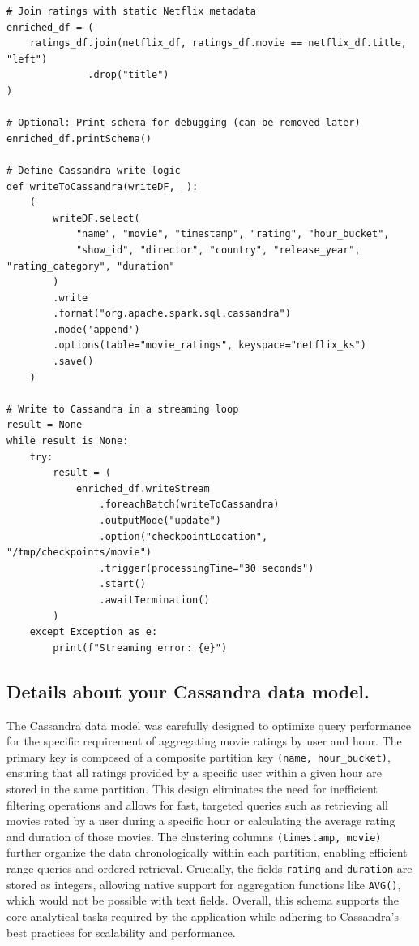 \documentclass[a4paper,11pt]{article}
\theoremstyle{mytheor}
\begin{document}
\begin{lstlisting}[label={list:second},caption=cassandra-spark-streaming-example.py.]
# Join ratings with static Netflix metadata
enriched_df = (
    ratings_df.join(netflix_df, ratings_df.movie == netflix_df.title, "left")
              .drop("title")
)

# Optional: Print schema for debugging (can be removed later)
enriched_df.printSchema()

# Define Cassandra write logic
def writeToCassandra(writeDF, _):
    (
        writeDF.select(
            "name", "movie", "timestamp", "rating", "hour_bucket",
            "show_id", "director", "country", "release_year", "rating_category", "duration"
        )
        .write
        .format("org.apache.spark.sql.cassandra")
        .mode('append')
        .options(table="movie_ratings", keyspace="netflix_ks")
        .save()
    )

# Write to Cassandra in a streaming loop
result = None
while result is None:
    try:
        result = (
            enriched_df.writeStream
                .foreachBatch(writeToCassandra)
                .outputMode("update")
                .option("checkpointLocation", "/tmp/checkpoints/movie")
                .trigger(processingTime="30 seconds")
                .start()
                .awaitTermination()
        )
    except Exception as e:
        print(f"Streaming error: {e}")
\end{lstlisting}

\subsection*{Details about your Cassandra data model.}

The Cassandra data model was carefully designed to optimize query performance for the specific requirement of aggregating movie ratings by user and hour. The primary key is composed of a composite partition key \texttt{(name, hour\_bucket)}, ensuring that all ratings provided by a specific user within a given hour are stored in the same partition. This design eliminates the need for inefficient filtering operations and allows for fast, targeted queries such as retrieving all movies rated by a user during a specific hour or calculating the average rating and duration of those movies. The clustering columns \texttt{(timestamp, movie)} further organize the data chronologically within each partition, enabling efficient range queries and ordered retrieval. Crucially, the fields \texttt{rating} and \texttt{duration} are stored as integers, allowing native support for aggregation functions like \texttt{AVG()}, which would not be possible with text fields. Overall, this schema supports the core analytical tasks required by the application while adhering to Cassandra’s best practices for scalability and performance.
\end{document}
